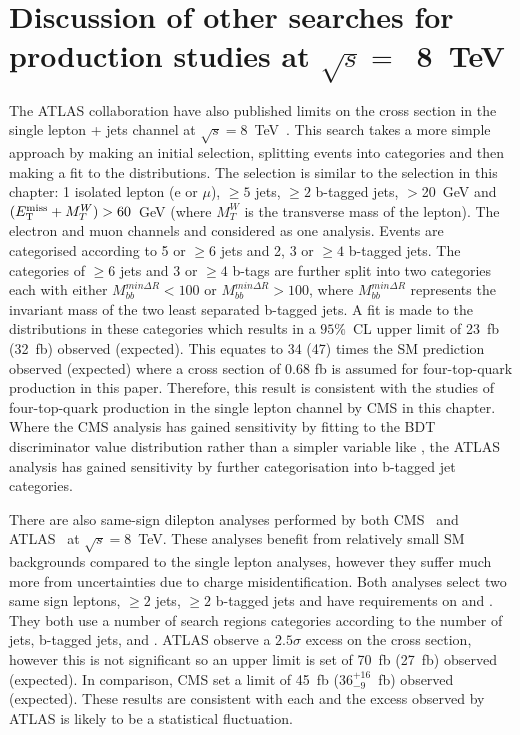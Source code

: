\section{Discussion of other searches for \tttt production studies at $\sqrt{s} =$~8~TeV}
\label{sec:ATLASresult}
 
The ATLAS collaboration have also published limits on the \tttt cross section in the single lepton + jets channel at $\sqrt{s}=8$~TeV~\cite{Aad:2015kqa}. This search takes a more simple approach by making an initial selection, splitting events into categories and then making a fit to the \HT distributions. The selection is similar to the selection in this chapter: 1 isolated lepton (e or $\mu$), $\geq 5$ jets, $\geq 2$ b-tagged jets, \MET$>$20~GeV and $(E_{\mathrm{T}}^{\text{miss}}+M_{T}^{W})>60$~GeV (where $M_{T}^{W}$ is the transverse mass of the lepton). The electron and muon channels and considered as one analysis. Events are categorised according to 5 or $\geq 6$ jets and 2, 3 or $\geq 4$ b-tagged jets. The categories of $\geq 6$ jets and 3 or $\geq 4$ b-tags are further split into two categories each with either $M_{bb}^{min\Delta R}<100$ or $M_{bb}^{min\Delta R}>100$, where $M_{bb}^{min\Delta R}$ represents the invariant mass of the two least separated b-tagged jets. A fit is made to the \HT distributions in these categories which results in a $95\%$~CL upper limit of 23~fb (32~fb) observed (expected). This equates to 34 (47) times the SM prediction observed (expected) where a cross section of 0.68 fb is assumed for four-top-quark production in this paper.
Therefore, this result is consistent with the studies of four-top-quark production in the single lepton channel by CMS in this chapter. Where the CMS analysis has gained sensitivity by fitting to the BDT discriminator value distribution rather than a simpler variable like \HT, the ATLAS analysis has gained sensitivity by further categorisation into b-tagged jet categories.

There are also same-sign dilepton analyses performed by both CMS~\cite{Chatrchyan:2013fea} and ATLAS~\cite{Aad:2015gdg} at $\sqrt{s}=8$~TeV. These analyses benefit from relatively small SM backgrounds compared to the single lepton analyses, however they suffer much more from uncertainties due to charge misidentification. Both analyses select two same sign leptons, $\geq 2$ jets, $\geq 2$ b-tagged jets and have requirements on \HT and \MET. They both use a number of search regions categories according to the number of jets, b-tagged jets, \HT and \MET. ATLAS observe a $2.5 \sigma$ excess on the \tttt cross section, however this is not significant so an upper limit is set of 70~fb (27~fb) observed (expected). In comparison, CMS set a limit of 45~fb ($36^{+16}_{-9}$~fb) observed (expected). These results are consistent with each and the excess observed by ATLAS is likely to be a statistical fluctuation. 

